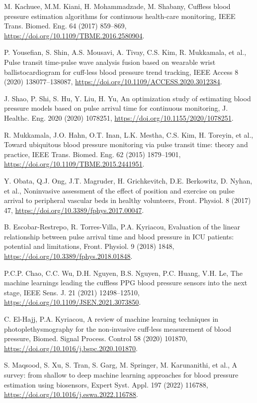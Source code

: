 \documentclass[preprint,12pt]{elsarticle}
\begin{document}
\begin{enumerate}[label={[\arabic*]},leftmargin=2.2em]
\item M. Kachuee, M.M. Kiani, H. Mohammadzade, M. Shabany, Cuffless blood pressure estimation algorithms for continuous health-care monitoring, IEEE Trans. Biomed. Eng. 64 (2017) 859--869, \url{https://doi.org/10.1109/TBME.2016.2580904}.
\item P. Yousefian, S. Shin, A.S. Mousavi, A. Tivay, C.S. Kim, R. Mukkamala, et al., Pulse transit time-pulse wave analysis fusion based on wearable wrist ballistocardiogram for cuff-less blood pressure trend tracking, IEEE Access 8 (2020) 138077--138087, \url{https://doi.org/10.1109/ACCESS.2020.3012384}.
\item J. Shao, P. Shi, S. Hu, Y. Liu, H. Yu, An optimization study of estimating blood pressure models based on pulse arrival time for continuous monitoring, J. Healthc. Eng. 2020 (2020) 1078251, \url{https://doi.org/10.1155/2020/1078251}.
\item R. Mukkamala, J.O. Hahn, O.T. Inan, L.K. Mestha, C.S. Kim, H. Toreyin, et al., Toward ubiquitous blood pressure monitoring via pulse transit time: theory and practice, IEEE Trans. Biomed. Eng. 62 (2015) 1879--1901, \url{https://doi.org/10.1109/TBME.2015.2441951}.
\item Y. Obata, Q.J. Ong, J.T. Magruder, H. Grichkevitch, D.E. Berkowitz, D. Nyhan, et al., Noninvasive assessment of the effect of position and exercise on pulse arrival to peripheral vascular beds in healthy volunteers, Front. Physiol. 8 (2017) 47, \url{https://doi.org/10.3389/fphys.2017.00047}.
\item B. Escobar-Restrepo, R. Torres-Villa, P.A. Kyriacou, Evaluation of the linear relationship between pulse arrival time and blood pressure in ICU patients: potential and limitations, Front. Physiol. 9 (2018) 1848, \url{https://doi.org/10.3389/fphys.2018.01848}.
\item P.C.P. Chao, C.C. Wu, D.H. Nguyen, B.S. Nguyen, P.C. Huang, V.H. Le, The machine learnings leading the cuffless PPG blood pressure sensors into the next stage, IEEE Sens. J. 21 (2021) 12498--12510, \url{https://doi.org/10.1109/JSEN.2021.3073850}.
\item C. El-Hajj, P.A. Kyriacou, A review of machine learning techniques in photoplethysmography for the non-invasive cuff-less measurement of blood pressure, Biomed. Signal Process. Control 58 (2020) 101870, \url{https://doi.org/10.1016/j.bspc.2020.101870}.
\item S. Maqsood, S. Xu, S. Tran, S. Garg, M. Springer, M. Karunanithi, et al., A survey: from shallow to deep machine learning approaches for blood pressure estimation using biosensors, Expert Syst. Appl. 197 (2022) 116788, \url{https://doi.org/10.1016/j.eswa.2022.116788}.

\end{enumerate}
\end{document}
